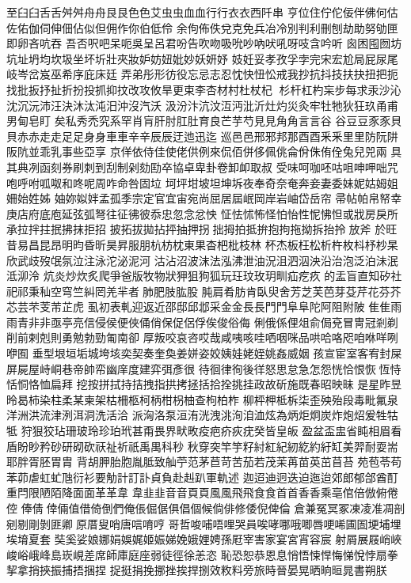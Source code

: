 ⾄臼⾅舌⾆舛⾇舟⾈艮⾉色⾊艾虫⾍血⾎行⾏衣⾐西阡串
亨位住佇佗佞伴佛何估佐佑伽伺伸佃佔似但佣作你伯低伶
余佝佈佚兌克免兵冶冷別判利刪刨劫助努劬匣即卵吝吭吞
吾否呎吧呆呃吳呈呂君吩告吹吻吸吮吵吶吠吼呀吱含吟听
囪困囤囫坊坑址坍均坎圾坐坏圻壯夾妝妒妨妞妣妙妖妍妤
妓妊妥孝孜孚孛完宋宏尬局屁尿尾岐岑岔岌巫希序庇床廷
弄弟彤形彷役忘忌志忍忱快忸忪戒我抄抗抖技扶抉扭把扼
找批扳抒扯折扮投抓抑抆改攻攸旱更束李杏材村杜杖杞
杉杆杠杓杗步每求汞沙沁沈沉沅沛汪決沐汰沌汨沖沒汽沃
汲汾汴沆汶沍沔沘沂灶灼災灸牢牡牠狄狂玖甬甫男甸皂盯
矣私秀禿究系罕肖肓肝肘肛肚育良芒芋芍見⾒角⾓言⾔谷
⾕豆⾖豕⾗貝⾙赤⾚走⾛足⾜身⾝車⾞辛⾟辰⾠迂迆迅迄
巡⾢邑邢邪邦那酉⾣釆⾤里⾥防阮阱阪阬並乖乳事些亞享
京佯依侍佳使佬供例來侃佰併侈佩佻侖佾侏侑佺兔兒兕兩
具其典冽函刻券刷刺到刮制剁劾劻卒協卓卑卦卷卸卹取叔
受味呵咖呸咕咀呻呷咄咒咆呼咐呱呶和咚呢周咋命咎固垃
坷坪坩坡坦坤坼夜奉奇奈奄奔妾妻委妹妮姑姆姐姍始姓姊
妯妳姒姅孟孤季宗定官宜宙宛尚屈居屆岷岡岸岩岫岱岳帘
帚帖帕帛帑幸庚店府底庖延弦弧弩往征彿彼忝忠忽念忿怏
怔怯怵怖怪怕怡性怩怫怛或戕房戾所承拉拌拄抿拂抹拒招
披拓拔拋拈抨抽押拐拙拇拍抵拚抱拘拖拗拆抬拎放斧
於旺昔易昌昆昂明昀昏昕昊昇服朋杭枋枕東果杳杷枇枝林
杯杰板枉松析杵枚枓杼杪杲欣武歧歿氓氛泣注泳沱泌泥河
沽沾沼波沫法泓沸泄油況沮泗泅泱沿治泡泛泊沬泯泜泖泠
炕炎炒炊炙爬爭爸版牧物狀狎狙狗狐玩玨玟玫玥甽疝疙疚
的盂盲直知矽社祀祁秉秈空穹竺糾罔羌羋者肺肥肢肱股
肫肩肴肪肯臥臾舍芳芝芙芭芽芟芹花芬芥芯芸芣芰芾芷虎
虱初表軋迎返近邵邸邱邶采金⾦長⾧門⾨阜⾩陀阿阻附陂
隹⾫雨⾬青⾮非亟亭亮信侵侯便俠俑俏保促侶俘俟俊俗侮
俐俄係俚俎俞侷兗冒冑冠剎剃削前剌剋則勇勉勃勁匍南卻
厚叛咬哀咨哎哉咸咦咳哇哂咽咪品哄哈咯咫咱咻咩咧咿囿
垂型垠垣垢城垮垓奕契奏奎奐姜姘姿姣姨娃姥姪姚姦威姻
孩宣宦室客宥封屎屏屍屋峙峒巷帝帥帟幽庠度建弈弭彥很
待徊律徇後徉怒思怠急怎怨恍恰恨恢恆恃恬恫恪恤扁拜
挖按拼拭持拮拽指拱拷拯括拾拴挑挂政故斫施既春昭映昧
是星昨昱昤曷柿染柱柔某柬架枯柵柩柯柄柑枴柚查枸柏柞
柳枰柙柢柝柒歪殃殆段毒毗氟泉洋洲洪流津洌洱洞洗活洽
派洶洛泵洹洧洸洩洮洵洎洫炫為炳炬炯炭炸炮炤爰牲牯牴
狩狠狡玷珊玻玲珍珀玳甚甭畏界畎畋疫疤疥疢疣癸皆皇皈
盈盆盃盅省盹相眉看盾盼眇矜砂研砌砍祆祉祈祇禹禺科秒
秋穿突竿竽籽紂紅紀紉紇約紆缸美羿耐耍耑耶胖胥胚胃胄
背胡胛胎胞胤胝致舢苧范茅苣苛苦茄若茂茉苒苗英茁苜苔
苑苞苓苟苯茆虐虹虻虺衍衫要觔計訂訃貞負赴赳趴軍軌述
迦迢迪迥迭迫迤迨郊郎郁郃酋酊重閂限陋陌降面⾯革⾰韋
⾱韭⾲音⾳頁⾴風⾵飛⾶食⾷首⾸香⾹乘亳倌倍倣俯倦倥
俸倩倖倆值借倚倒們俺倀倔倨俱倡個候倘俳修倭倪俾倫
倉兼冤冥冢凍凌准凋剖剜剔剛剝匪卿原厝叟哨唐唁唷哼
哥哲唆哺唔哩哭員唉哮哪哦唧唇哽唏圃圄埂埔埋埃堉夏套
奘奚娑娘娜娟娛娓姬娠娣娩娥娌娉孫屘宰害家宴宮宵容宸
射屑展屐峭峽峻峪峨峰島崁峴差席師庫庭座弱徒徑徐恙恣
恥恐恕恭恩息悄悟悚悍悔悌悅悖扇拳挈拿捎挾振捕捂捆捏
捉挺捐挽挪挫挨捍捌效敉料旁旅時晉晏晃晒晌晅晁書朔朕
